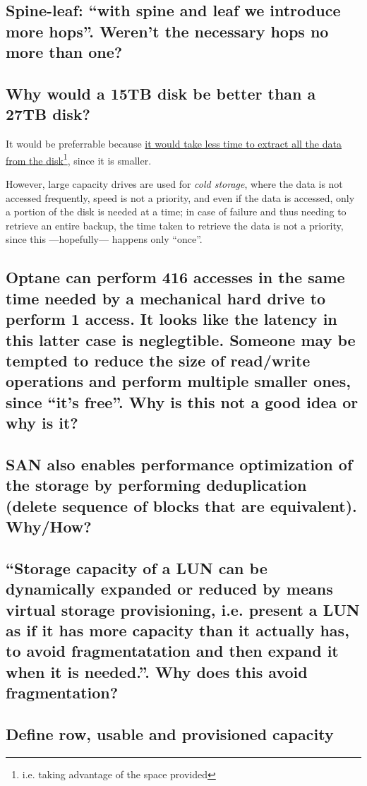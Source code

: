 \subsection{Spine-leaf: ``with spine and leaf we introduce \textbf{more hops}''. Weren't the necessary hops no more than one?}

\subsection{Why would a 15TB disk be better than a 27TB disk?}
It would be preferrable because \ul{it would take less time to extract all the data from the disk}\footnote{i.e. taking advantage of the space provided}, since it is smaller.

However, large capacity drives are used for \textit{cold storage}, where the data is not accessed frequently, speed is not a priority, and even if the data is accessed, only a portion of the disk is needed at a time; in case of failure and thus needing to retrieve an entire backup, the time taken to retrieve the data is not a priority, since this ---hopefully--- happens only ``once''.

\subsection{Optane can perform 416 accesses in the same time needed by a mechanical hard drive to perform 1 access. It looks like the latency in this latter case is neglegtible. Someone may be tempted to reduce the size of read/write operations and perform multiple smaller ones, since ``it's free''. Why is this not a good idea or why is it?}

\subsection{SAN also enables performance optimization of the storage by performing
deduplication (delete sequence of blocks that are equivalent). Why/How?}

\subsection{``Storage \textbf{capacity} of a LUN can be dynamically expanded or reduced by means \textbf{virtual storage provisioning}, i.e. present a LUN as if it has more capacity than it actually has, to avoid fragmentatation and then expand it when it is needed.''. Why does this avoid fragmentation?}

\subsection{Define row, usable and provisioned capacity}